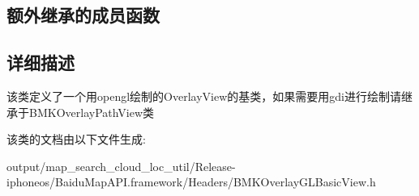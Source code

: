 \subsection*{额外继承的成员函数}


\subsection{详细描述}
该类定义了一个用opengl绘制的\+Overlay\+View的基类，如果需要用gdi进行绘制请继承于\+B\+M\+K\+Overlay\+Path\+View类 

该类的文档由以下文件生成\+:\begin{DoxyCompactItemize}
\item 
output/map\+\_\+search\+\_\+cloud\+\_\+loc\+\_\+util/\+Release-\/iphoneos/\+Baidu\+Map\+A\+P\+I.\+framework/\+Headers/B\+M\+K\+Overlay\+G\+L\+Basic\+View.\+h\end{DoxyCompactItemize}
